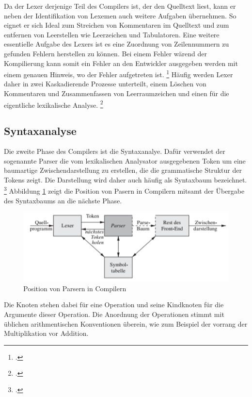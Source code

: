 Da der Lexer derjenige Teil des Compilers ist, der den Quelltext liest, kann er neben der Identifikation von Lexemen auch weitere Aufgaben übernehmen. So eignet er sich Ideal zum Streichen von Kommentaren im Quelltext und zum entfernen von Leerstellen wie Leerzeichen und Tabulatoren.  Eine weitere essentielle Aufgabe des Lexers ist es eine Zuordnung von Zeilennummern zu gefunden Fehlern herstellen zu können.  Bei einem Fehler wärend der Kompilierung kann somit ein Fehler an den Entwickler ausgegeben werden mit einem genauen Hinweis,  wo der Fehler aufgetreten ist.  \footcite[Vgl.][S. 135.]{Ullmann2008} 
Häufig werden Lexer daher in zwei Kaskadierende Prozesse unterteilt, einem Löschen von Kommentaren und Zusammenfassen von Leerraumzeichen und einen für die eigentliche lexikalische Analyse.  \footcite[Vgl.][S. 136.]{Ullmann2008} 

\subsection{Syntaxanalyse}
Die zweite Phase des Compilers ist die Syntaxanalye.  Dafür verwendet der sogenannte Parser die vom lexikalischen Analysator ausgegebenen Token um eine baumartige Zwischendarstellung zu erstellen, die die grammatische Struktur der Tokens zeigt.  Die Darstellung wird daher auch häufig als Syntaxbaum bezeichnet.  \footcite[Vgl.][S. 9]{Ullmann2008} Abbildung \ref{fig:ParserInteraktionen} zeigt die Position von Pasern in Compilern mitsamt der Übergabe des Syntaxbaums an die nächste Phase. 

\begin{figure}[!ht]
 \includegraphics{Images/Compiler/ParserStellung.png}
 \caption[Position von Parsern in Compilern]{Position von Parsern in Compilern\protect\footnotemark}
 \label{fig:ParserInteraktionen}
\end{figure}

Die Knoten stehen dabei für eine Operation und seine Kindknoten für die Argumente dieser Operation. Die Anordnung der Operationen stimmt mit üblichen arithmentischen Konventionen überein, wie zum Beispiel der vorrang der Multiplikation vor Addition. 


